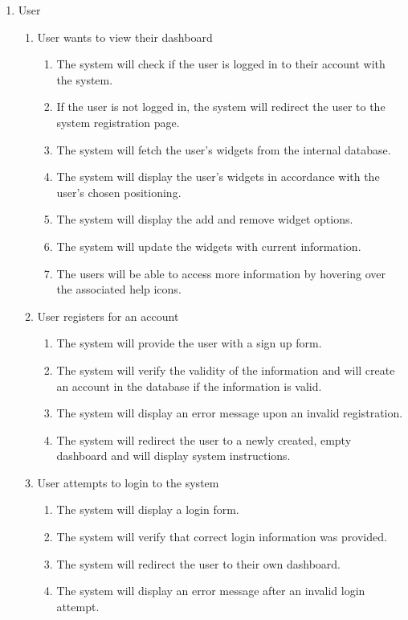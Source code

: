 \documentclass[]{article}
\begin{document}
	
	\begin{enumerate}[{VP}1]
		\item User
		\begin{enumerate}[{BE}1]
			\item User wants to view their dashboard
			\begin{enumerate}
				\item The system will check if the user is logged in to their account with the system.
				\item If the user is not logged in, the system will redirect the user to the system registration page.
				\item The system will fetch the user's widgets from the internal database.
				\item The system will display the user's  widgets in accordance with the user's chosen positioning.
				\item The system will display the add and remove widget options.
				\item The system will update the widgets with current information.
				\item The users will be able to access more information by hovering over the associated help icons.
			\end{enumerate}
			\item User registers for an account
			\begin{enumerate}
				\item The system will provide the user with a sign up form.
				\item The system will verify the validity of the information and will create an account in the database if the information is valid.   
				\item The system will display an error message upon an invalid registration.
				\item The system will redirect the user to a newly created, empty dashboard and will display system instructions.
			\end{enumerate}
			\item User attempts to login to the system
			\begin{enumerate}
				\item The system will display a login form.
				\item The system will verify that correct login information was provided.
				\item The system will redirect the user to their own dashboard. 
				\item The system will display an error message after an invalid login attempt.

\end{enumerate}
\end{enumerate}
\end{enumerate}
\end{document}
